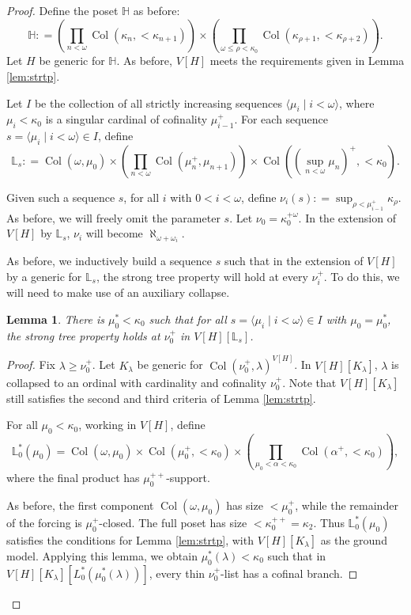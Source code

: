 \documentclass[psamsfonts]{amsart}
\newtheorem{lemma}[thm]{Lemma}
\theoremstyle{definition}
\newcommand{\defeq}{\mathrel{\mathop:}=}
\newcommand{\LL}{\mathbb{L}}
\newcommand{\HH}{\mathbb{H}}
\newcommand{\la}{\lambda}
\newcommand{\ka}{\kappa}
\newcommand{\w}{\omega}
\DeclareMathOperator{\Coll}{Col}
\numberwithin{equation}{section}
\begin{document}
\begin{proof}
	
	Define the poset $\HH$ as before:
	\[\HH\defeq \left(\prod_{n<\w} \Coll(\ka_n, <\ka_{n+1})\right) \times \left( \prod_{\w\leq\rho<\ka_0} \Coll(\ka_{\rho+1}, <\ka_{\rho+2})\right).\] Let $H$ be generic for $\HH$. As before, $V[H]$ meets the requirements given in Lemma \ref{lem:strtp}.
	
	Let $I$ be the collection of all strictly increasing sequences $\langle \mu_i \mid i<\w\rangle$, where $\mu_i <\ka_0$ is a singular cardinal of cofinality $\mu_{i-1}^+$. For each sequence $s = \langle \mu_i \mid i<\w\rangle \in I$, define 
	\[\LL_s \defeq \Coll(\w, \mu_0) \times \left(\prod_{n<\w} \Coll(\mu_{n}^+, \mu_{n+1})\right)\times \Coll\left((\sup_{n<\w}\mu_n)^+, <\ka_0\right).\]
	
	Given such a sequence $s$, for all $i$ with $0<i<\w$, define $\nu_i(s) \defeq \sup_{\rho < \mu_{i-1}^+} \ka_\rho$. As before, we will freely omit the parameter $s$. Let $\nu_0 = \ka_0^{+\w}$. In the extension of $V[H]$ by $\LL_s$, $\nu_i$ will become $\aleph_{\w+\w_i}$.
	
	As before, we inductively build a sequence $s$ such that in the extension of $V[H]$ by a generic for $\LL_s$, the strong tree property will hold at every $\nu_{i}^+$. To do this, we will need to make use of an auxiliary collapse.
	
	\begin{lemma}\label{lem:basestp}
		There is $\mu^*_0 < \ka_0$ such that for all $s = \langle \mu_i \mid i<\w\rangle \in I$ with $\mu_0 = \mu^*_0$, the strong tree property holds at $\nu_0^+$ in $V[H][\LL_s]$.
	\end{lemma}
	\begin{proof}
		Fix $\la \geq \nu_0^+$.
		Let $K_\la$ be generic for $\Coll(\nu_0^+, \la)^{V[H]}$. In $V[H][K_\la]$, $\la$ is collapsed to an ordinal with cardinality and cofinality $\nu_0^+$. Note that $V[H][K_\la]$ still satisfies the second and third criteria of Lemma \ref{lem:strtp}.
		
		For all $\mu_0 < \ka_0$, working in $V[H]$, define
		\[\LL_0^*(\mu_0) = \Coll(\w, \mu_0) \times \Coll(\mu_0^+, <\ka_0) \times  \left(\prod_{\mu_0 < \alpha < \ka_0} \Coll(\alpha^+, <\ka_0)\right),\]
		where the final product has $\mu_0^{++}$-support. 
		
		As before, the first component $\Coll(\w, \mu_0)$ has size $< \mu_0^+$, while the remainder of the forcing is $\mu_0^+$-closed. The full poset has size $<\ka_0^{++} = \ka_2$. Thus $\LL_0^*(\mu_0)$ satisfies the conditions for Lemma \ref{lem:strtp}, with $V[H][K_\la]$ as the ground model. Applying this lemma, we obtain $\mu^*_0(\la) < \ka_0$ such that in $V[H][K_\la][L^*_0(\mu^*_0(\la))]$, every thin $\nu_0^+$-list has a cofinal branch.
		

\end{proof}
\end{proof}
\end{document}
